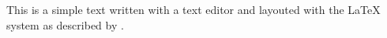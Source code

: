 \usepackage{natbib}

This is a simple text written with a text editor and layouted with the
{\LaTeX} system as described by \citet{lamport94}.



